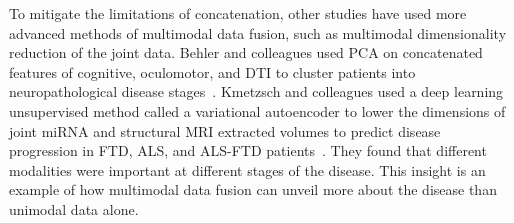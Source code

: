 %
To mitigate the limitations of concatenation, other studies have used more advanced methods of multimodal data fusion, such as multimodal dimensionality reduction of the joint data.
Behler and colleagues used PCA on concatenated features of cognitive, oculomotor, and DTI to cluster patients into neuropathological disease stages~\cite{behlerMultimodalVivoStaging2022}.
Kmetzsch and colleagues used a deep learning unsupervised method called a variational autoencoder to lower the dimensions of joint miRNA and structural MRI extracted volumes to predict disease progression in FTD, ALS, and ALS-FTD patients~\cite{kmetzschDiseaseProgressionScore2022a}.
They found that different modalities were important at different stages of the disease.
This insight is an example of how multimodal data fusion can unveil more about the disease than unimodal data alone.

